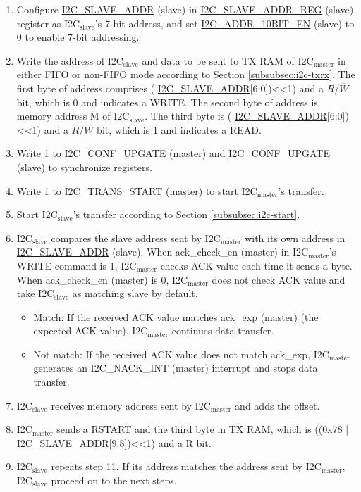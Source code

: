 \documentclass[main\_\_EN.tex]{subfiles}
\begin{document}
\begin{enumerate}
\item Configure \hyperref[fielddesc:I2CSLAVEADDR]{I2C\_SLAVE\_ADDR} (slave) in \hyperref[regdesc:I2CSLAVEADDRREG]{I2C\_SLAVE\_ADDR\_REG} (slave) register as I2C$_\text{slave}$'s 7-bit address, and set \hyperref[fielddesc:I2CADDR10BITEN]{I2C\_ADDR\_10BIT\_EN} (slave) to 0 to enable 7-bit addressing.
\item Write the address of I2C$_\text{slave}$ and data to be sent to TX RAM of I2C$_\text{master}$ in either FIFO or non-FIFO mode according to Section \ref{subsubsec:i2c-txrx}. The first byte of address comprises ( \hyperref[fielddesc:I2CSLAVEADDR]{I2C\_SLAVE\_ADDR}[6:0])<<1) and a $R/\overline W$ bit, which is 0 and indicates a WRITE. The second byte of address is memory address M of I2C$_\text{slave}$. The third byte is ( \hyperref[fielddesc:I2CSLAVEADDR]{I2C\_SLAVE\_ADDR}[6:0])<<1) and a $R/\overline W$ bit, which is 1 and indicates a READ.

\item Write 1 to \hyperref[fielddesc:I2CCONFUPGATE]{I2C\_CONF\_UPGATE} (master) and \hyperref[fielddesc:I2CCONFUPGATE]{I2C\_CONF\_UPGATE} (slave) to synchronize registers.
\item Write 1 to \hyperref[fielddesc:I2CTRANSSTART]{I2C\_TRANS\_START} (master) to start I2C$_\text{master}$'s transfer.
\item Start I2C$_\text{slave}$'s transfer according to Section \ref{subsubsec:i2c-start}.
\item I2C$_\text{slave}$ compares the slave address sent by I2C$_\text{master}$ with its own address in \hyperref[fielddesc:I2CSLAVEADDR]{I2C\_SLAVE\_ADDR} (slave). When ack\_check\_en (master) in I2C$_\text{master}$'s WRITE command is 1, I2C$_\text{master}$ checks ACK value each time it sends a byte. When ack\_check\_en (master) is 0, I2C$_\text{master}$ does not check ACK value and take I2C$_\text{slave}$ as matching slave by default.
\begin{itemize}
\item Match: If the received ACK value matches ack\_exp (master) (the expected ACK value), I2C$_\text{master}$ continues data transfer.
\item Not match: If the received ACK value does not match ack\_exp, I2C$_\text{master}$ generates an I2C\_NACK\_INT (master) interrupt and stops data transfer.
\end{itemize}
\item I2C$_\text{slave}$ receives memory address sent by I2C$_\text{master}$ and adds the offset.
\item I2C$_\text{master}$ sends a RSTART and the third byte in TX RAM, which is ((0x{}78 | \hyperref[fielddesc:I2CSLAVEADDR]{I2C\_SLAVE\_ADDR}[9:8])<<1) and a R bit.
\item I2C$_\text{slave}$ repeats step 11. If its address matches the address sent by I2C$_\text{master}$, I2C$_\text{slave}$ proceed on to the next steps.


\end{enumerate}
\end{document}
